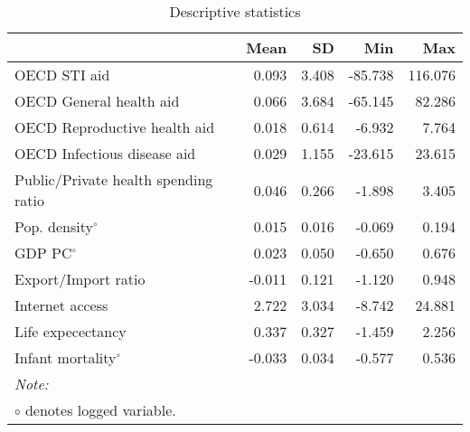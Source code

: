 \begin{table}
\centering
\caption{\label{tab:table:descriptive-app}Descriptive statistics}
\centering
\begin{tabular}[t]{lrrrr}
\toprule
 & Mean & SD & Min & Max\\
\midrule
OECD STI aid & 0.093 & 3.408 & -85.738 & 116.076\\
OECD General health aid & 0.066 & 3.684 & -65.145 & 82.286\\
OECD Reproductive health aid & 0.018 & 0.614 & -6.932 & 7.764\\
OECD Infectious disease aid & 0.029 & 1.155 & -23.615 & 23.615\\
Public/Private health spending ratio & 0.046 & 0.266 & -1.898 & 3.405\\
Pop. density$^{\circ}$ & 0.015 & 0.016 & -0.069 & 0.194\\
GDP PC$^{\circ}$ & 0.023 & 0.050 & -0.650 & 0.676\\
Export/Import ratio & -0.011 & 0.121 & -1.120 & 0.948\\
Internet access & 2.722 & 3.034 & -8.742 & 24.881\\
Life expecectancy & 0.337 & 0.327 & -1.459 & 2.256\\
Infant mortality$^{\circ}$ & -0.033 & 0.034 & -0.577 & 0.536\\
\bottomrule
\multicolumn{5}{l}{\rule{0pt}{1em}\textit{Note: }}\\
\multicolumn{5}{l}{\rule{0pt}{1em}${\circ}$ denotes logged variable.}\\
\end{tabular}
\end{table}
